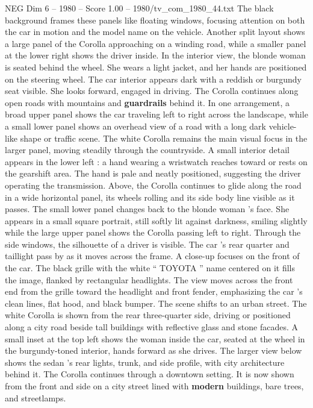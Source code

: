 \begin{textsample}{NEG Dim 6 – 1980 – Score 1.00 – 1980/tv\_com\_1980\_44.txt}
The black background frames these panels like floating windows, focusing attention on both the car in motion and the model name on the vehicle.
Another split layout shows a large panel of the Corolla approaching on a winding road, while a smaller panel at the lower right shows the driver inside.
In the interior view, the blonde woman is seated behind the wheel.
She wears a light jacket, and her hands are positioned on the steering wheel.
The car interior appears dark with a reddish or burgundy seat visible.
She looks forward, engaged in driving.
The Corolla continues along open roads with mountains and \textbf{guardrails} behind it.
In one arrangement, a broad upper panel shows the car traveling left to right across the landscape, while a small lower panel shows an overhead view of a road with a long dark vehicle-like shape or traffic scene.
The white Corolla remains the main visual focus in the larger panel, moving steadily through the countryside.
A small interior detail appears in the lower left : a hand wearing a wristwatch reaches toward or rests on the gearshift area.
The hand is pale and neatly positioned, suggesting the driver operating the transmission.
Above, the Corolla continues to glide along the road in a wide horizontal panel, its wheels rolling and its side body line visible as it passes.
The small lower panel changes back to the blonde woman ’s face.
She appears in a small square portrait, still softly lit against darkness, smiling slightly while the large upper panel shows the Corolla passing left to right.
Through the side windows, the silhouette of a driver is visible.
The car ’s rear quarter and taillight pass by as it moves across the frame.
A close-up focuses on the front of the car.
The black grille with the white “ TOYOTA ” name centered on it fills the image, flanked by rectangular headlights.
The view moves across the front end from the grille toward the headlight and front fender, emphasizing the car ’s clean lines, flat hood, and black bumper.
The scene shifts to an urban street.
The white Corolla is shown from the rear three-quarter side, driving or positioned along a city road beside tall buildings with reflective glass and stone facades.
A small inset at the top left shows the woman inside the car, seated at the wheel in the burgundy-toned interior, hands forward as she drives.
The larger view below shows the sedan ’s rear lights, trunk, and side profile, with city architecture behind it.
The Corolla continues through a downtown setting.
It is now shown from the front and side on a city street lined with \textbf{modern} buildings, bare trees, and streetlamps.

\end{textsample}
